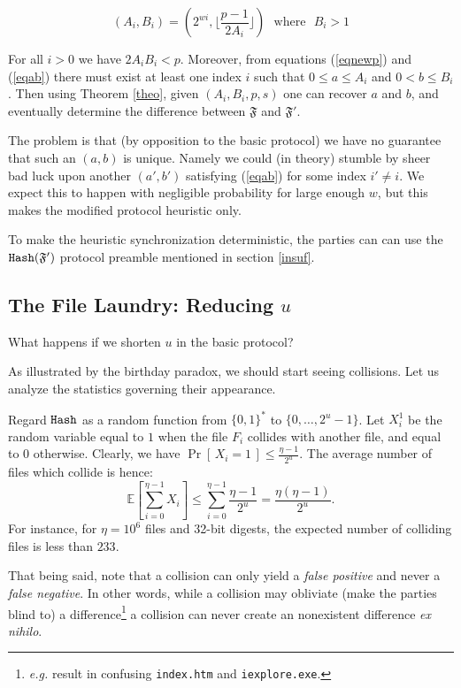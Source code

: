 \documentclass[11pt]{llncs}
\newcommand{\Prob}[1]{{\Pr\left[\,{#1}\,\right]}}
\newcommand{\EE}[1]{{\mathbb{E}\left[{#1}\right]}}
\begin{document}
$$(A_i,B_i)=(2^{wi},\lfloor \frac{p-1}{2 A_i} \rfloor)\mbox{~~where~~}B_i>1$$

For all $i>0$ we have $2 A_i B_i<p$. Moreover, from equations (\ref{eqnewp}) and (\ref{eqab}) there must exist at least one index $i$ such that $0 \leq a \leq A_i$ and $0 <b \leq B_i$. Then using Theorem \ref{theo}, given $(A_i,B_i,p,s)$ one can recover $a$ and $b$, and eventually determine the difference between $\mathfrak{F}$ and $\mathfrak{F}'$.\smallskip

The problem is that (by opposition to the basic protocol) we have no guarantee that such an $(a,b)$ is unique. Namely we could (in theory) stumble by sheer bad luck upon another $(a',b')$ satisfying (\ref{eqab}) for some index $i' \neq i$. We expect this to happen with negligible probability for large enough $w$, but this makes the modified protocol heuristic only.\smallskip

To make the heuristic synchronization deterministic, the parties can can use the $\mbox{{\tt Hash}}(\mathfrak{F}')$ protocol preamble mentioned in section \ref{insuf}.

\subsection{The File Laundry: Reducing $u$}

What happens if we shorten $u$ in the basic protocol?\smallskip

As illustrated by the birthday paradox, we should start seeing collisions. Let us analyze the statistics governing their appearance.

Regard $\mbox{{\tt Hash}}$ as a random function from $\{0,1\}^*$ to $\{0,\dots,2^u-1\}$.
Let $X^1_i$ be the random variable equal to $1$ when the file $F_i$ collides with another file, and equal to $0$ otherwise.
Clearly, we have $\Prob{X_i = 1} \le \frac{\eta -1}{2^u}$.
The average number of files which collide is hence:
\[ \EE{\sum_{i=0}^{\eta-1} X_i} \le \sum_{i=0}^{\eta-1} \frac{\eta -1}{2^u} = \frac{\eta (\eta - 1)}{2^u}. \]
For instance, for $\eta=10^6$ files and 32-bit digests, the expected number of colliding files is less than $233$.\smallskip

That being said, note that a collision can only yield a {\sl false positive} and never a {\sl false negative}. In other words, while a collision may obliviate (make the parties blind to) a difference\footnote{{\sl e.g.} result in confusing {\tt index.htm} and {\tt iexplore.exe}.} a collision can never create an nonexistent difference {\sl ex nihilo}.\smallskip
\end{document}

